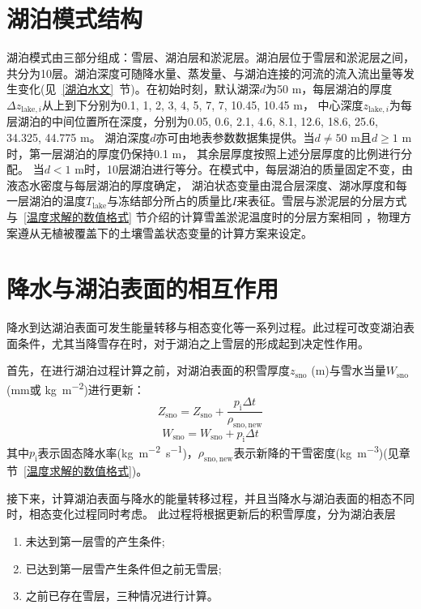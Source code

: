 \section{湖泊模式结构}
湖泊模式由三部分组成：雪层、湖泊层和淤泥层。湖泊层位于雪层和淤泥层之间，
共分为10层。湖泊深度可随降水量、蒸发量、与湖泊连接的河流的流入流出量等发生变化(见~\ref{湖泊水文}~节)。在初始时刻，默认湖深$d$为50 m，每层湖泊的厚度$\Delta z_{\mathrm{lake},i}$从上到下分别为0.1, 1, 2, 3, 4, 5, 7, 7, 10.45, 10.45 m，
中心深度$z_{\mathrm{lake},i}$为每层湖泊的中间位置所在深度，分别为0.05, 0.6, 2.1, 4.6, 8.1, 12.6, 18.6, 25.6, 34.325, 44.775 m。
湖泊深度$d$亦可由地表参数数据集提供。当$d\neq50$ m且$d\geqslant 1$ m时，第一层湖泊的厚度仍保持0.1 m，
其余层厚度按照上述分层厚度的比例进行分配。
当$d<1$ m时，10层湖泊进行等分。在模式中，每层湖泊的质量固定不变，由液态水密度与每层湖泊的厚度确定，
湖泊状态变量由混合层深度、湖冰厚度和每一层湖泊的温度$T_{\mathrm{lake}}$与冻结部分所占的质量比$I$来表征。雪层与淤泥层的分层方式与~\ref{温度求解的数值格式} 节介绍的计算雪盖淤泥温度时的分层方案相同
，物理方案遵从无植被覆盖下的土壤雪盖状态变量的计算方案来设定。


\section{降水与湖泊表面的相互作用}
降水到达湖泊表面可发生能量转移与相态变化等一系列过程。此过程可改变湖泊表面条件，尤其当降雪存在时，对于湖泊之上雪层的形成起到决定性作用。


首先，在进行湖泊过程计算之前，对湖泊表面的积雪厚度$z_{\mathrm{sno}}$ (m)与雪水当量$W_{\mathrm{sno}}$ (mm或 \unit{kg.m^{-2}})进行更新：
\begin{equation}
  Z_{\mathrm{sno}}=Z_{\mathrm{sno}}+\frac{p_{\mathrm{i}} \Delta t}{\rho_{\mathrm{sno,new}}}
\end{equation}
\begin{equation}
  W_{\mathrm{sno}}=W_{\mathrm{sno}}+p_{\mathrm{i}} \Delta t
\end{equation}
其中$p_{\mathrm {i}} $表示固态降水率(\unit{kg.m^{-2}.s^{-1}})，$\rho_{\mathrm{sno,new}}$表示新降的干雪密度(\unit{kg.m^{-3}})(见章节~\ref{温度求解的数值格式})。

接下来，计算湖泊表面与降水的能量转移过程，并且当降水与湖泊表面的相态不同时，相态变化过程同时考虑。
此过程将根据更新后的积雪厚度，分为湖泊表层
\begin{enumerate}
  \item 未达到第一层雪的产生条件;
  \item 已达到第一层雪产生条件但之前无雪层;
  \item 之前已存在雪层，三种情况进行计算。
\end{enumerate}

